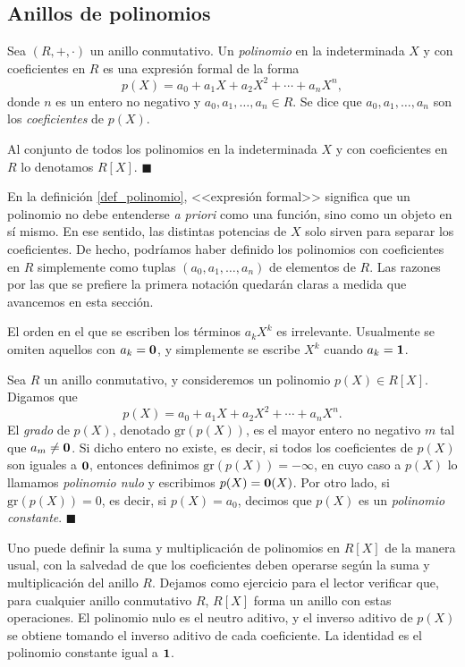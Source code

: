 \subsection{Anillos de polinomios}

\begin{definition} \label{def_polinomio}
Sea $(R, +, \cdot)$ un anillo conmutativo. Un \emph{polinomio} en la indeterminada $X$ y con coeficientes en $R$ es una expresión formal de la forma
$$p(X) = a_0 + a_1X + a_2X^2 + \cdots + a_n X^n,$$
donde $n$ es un entero no negativo y $a_0, a_1, \dots, a_n \in R$. Se dice que $a_0, a_1, \dots, a_n$ son los \emph{coeficientes} de $p(X)$.

Al conjunto de todos los polinomios en la indeterminada $X$ y con coeficientes en $R$ lo denotamos $R[X]$. 
\hfill$\blacksquare$
\end{definition}

En la definición \ref{def_polinomio}, <<expresión formal>> significa que un polinomio no debe entenderse \textit{a priori} como una función, sino como un objeto en sí mismo. En ese sentido, las distintas potencias de $X$ solo sirven para separar los coeficientes. De hecho, podríamos haber definido los polinomios con coeficientes en $R$ simplemente como tuplas $(a_0, a_1, \dots, a_n)$ de elementos de $R$. Las razones por las que se prefiere la primera notación quedarán claras a medida que avancemos en esta sección.

El orden en el que se escriben los términos $a_k X^k$ es irrelevante. Usualmente se omiten aquellos con $a_k=\mathbf{0}$, y simplemente se escribe $X^k$ cuando $a_k = \mathbf{1}$.

\begin{definition}
Sea $R$ un anillo conmutativo, y consideremos un polinomio $p(X) \in R[X]$. Digamos que
$$p(X) = a_0 + a_1X + a_2X^2 + \cdots + a_n X^n.$$
El \emph{grado} de $p(X)$, denotado $\mathrm{gr}(p(X))$, es el mayor entero no negativo $m$ tal que $a_m \neq \mathbf{0}$. Si dicho entero no existe, es decir, si todos los coeficientes de $p(X)$ son iguales a $\mathbf{0}$, entonces definimos $\mathrm{gr}(p(X)) = -\infty$, en cuyo caso a $p(X)$ lo llamamos \emph{polinomio nulo} y escribimos $p(X) = \mathbf{0}(X)$. Por otro lado, si $\mathrm{gr}(p(X)) = 0$, es decir, si $p(X) = a_0$, decimos que $p(X)$ es un \emph{polinomio constante}.
\hfill$\blacksquare$
\end{definition}

Uno puede definir la suma y multiplicación de polinomios en $R[X]$ de la manera usual, con la salvedad de que los coeficientes deben operarse según la suma y multiplicación del anillo $R$. Dejamos como ejercicio para el lector verificar que, para cualquier anillo conmutativo $R$, $R[X]$ forma un anillo con estas operaciones. El polinomio nulo es el neutro aditivo, y el inverso aditivo de $p(X)$ se obtiene tomando el inverso aditivo de cada coeficiente. La identidad es el polinomio constante igual a $\mathbf{1}$.


